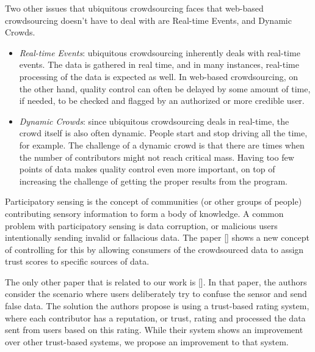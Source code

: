 \documentclass[9pt,twocolumn]{article}
\begin{document}
	Two other issues that ubiquitous crowdsourcing faces that web-based crowdsourcing doesn't have to deal with are Real-time Events, and Dynamic Crowds.
	\begin{itemize}
		\item \emph{Real-time Events}: ubiquitous crowdsourcing inherently deals with real-time events. The data is gathered in real time, and in many instances, real-time processing of the data is expected as well. %
		In web-based crowdsourcing, on the other hand, quality control can often be delayed by some amount of time, if needed, to be checked and flagged by an authorized or more credible user. 
		
		
		\item \emph{Dynamic Crowds}: since ubiquitous crowdsourcing deals in real-time, the crowd itself is also often dynamic. People start and stop driving all the time, for example. The challenge of a dynamic crowd is that there are times when the number of contributors might not reach critical mass. Having too few points of data makes quality control even more important, on top of increasing the challenge of getting the proper results from the program.
	\end{itemize}
	
	Participatory sensing is the concept of communities (or other groups of people) contributing sensory information to form a body of knowledge. %
	A common problem with participatory sensing is data corruption, or malicious users intentionally sending invalid or fallacious data. The paper %
	[] shows a new concept of controlling for this by allowing consumers of the crowdsourced data to assign trust scores to specific sources of data. 
	
	The only other paper that is related to our work is []. %
	In that paper, the authors consider the scenario where users deliberately try to confuse the sensor and send false data. The solution the authors propose is using a trust-based rating system, where each contributor has a reputation, or trust, rating and processed the data sent from users based on this rating. While their system shows an improvement over other trust-based systems, we propose an improvement to that system.
	
\end{document}
